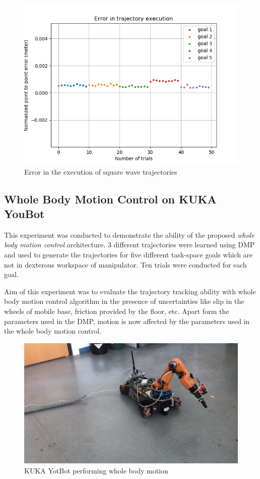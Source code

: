\begin{figure}[H]
	\centering
	\includegraphics[scale=0.6]{images/1/square_e.png}
	\caption{Error in the execution of square wave trajectories}
	\label{fig:square_e}
\end{figure}

\subsection{Whole Body Motion Control on KUKA YouBot}

This experiment was conducted to demonstrate the ability of the proposed \textit{whole body motion control} architecture. 3 different trajectories were learned using DMP and used to generate the trajectories for five different task-space goals which are not in dexterous workspace of manipulator. Ten trials were conducted for each goal. 

Aim of this experiment was to evaluate the trajectory tracking ability with whole body motion control algorithm in the presence of uncertainties like slip in the wheels of mobile base, friction provided by the floor, etc. Apart form the parameters used in the DMP, motion is now affected by the parameters used in the whole body motion control. 

\begin{figure}[H]
	\centering
	\includegraphics[scale=0.2]{images/wbc_kuka.png}
	\caption{KUKA YotBot performing whole body motion}
	\label{fig:wbc_kuka}
\end{figure}


